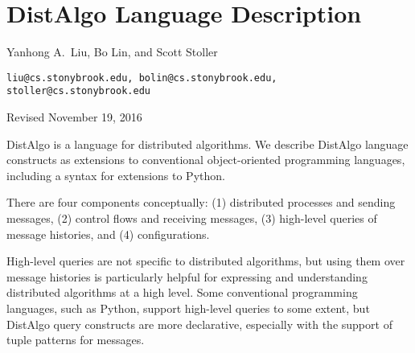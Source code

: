 \documentclass[12pt]{article}
\newcommand{\notes}[1]{} %
\newcommand{\body}[1]{} %
\newcommand{\mysubsec}[1]{\subsection*{#1}}
\newcommand{\myparag}[1]{\vspace{2ex}\noindent\b{#1.}~}
\newcommand{\m}[1]{$#1$} %
\renewcommand{\c}[1]{{\tt\small #1}} %
\renewcommand{\b}[1]{{\bf #1}} %
\renewcommand{\|}{\mathify{\,\mbox{\c{|}}\,}} %
\renewcommand{\=}{\mathify{\,=\,}\linebreak[0]}
\begin{document}
\body{} %

\newpage
\appendix

\renewcommand{\thesection}{\arabic{section}}

\setcounter{page}{1}
\setcounter{section}{0}


\notes{}

\section*{{\Large DistAlgo Language Description}}

{\large Yanhong A.\ Liu, Bo Lin, and Scott Stoller}

\c{liu@cs.stonybrook.edu, bolin@cs.stonybrook.edu, stoller@cs.stonybrook.edu}

{\small Revised November 19, 2016}
\vspace{4ex}

\def\da{\vspace{-2.5ex}in DistAlgo\vspace{-2.5ex}}
\def\langmap{\vspace{.5ex}\m{\longrightarrow}~\b{in Python syntax:~}
  \vspace{.0ex}}
\renewcommand{\mysubsec}[1]{\section{#1}}
\renewcommand{\myparag}[1]{\subsection{#1}}


DistAlgo is a language for distributed algorithms.  We describe DistAlgo
language constructs as extensions to conventional object-oriented
programming languages, including a syntax for extensions to Python.

There are four components conceptually: (1) distributed processes and
sending messages, (2) control flows and receiving messages, (3) high-level
queries of message histories, and (4) configurations.

High-level queries are not specific to distributed algorithms, but using
them over message histories is particularly helpful for expressing and
understanding distributed algorithms at a high level.  Some conventional
programming languages, such as Python, support high-level queries to some
extent, but DistAlgo query constructs are more declarative, especially with
the support of tuple patterns for messages.
\end{document}
